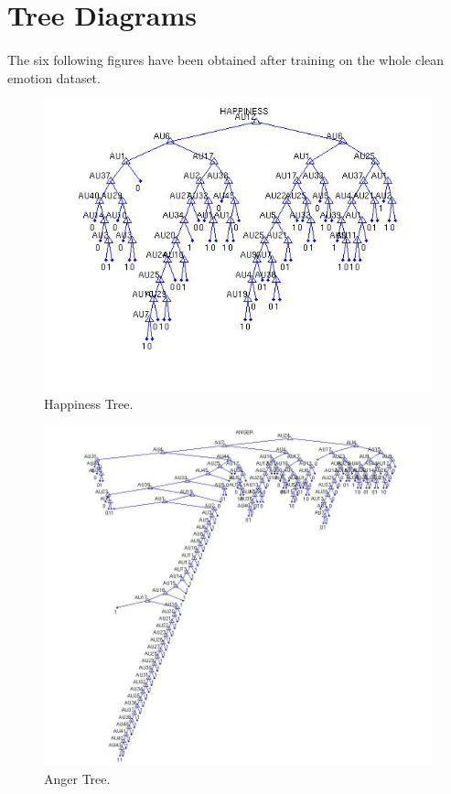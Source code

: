 \documentclass[a4paper,12pt,oneside,final]{report}
\newenvironment{changemargin}[2]{\begin{list}{}{%
\setlength{\topsep}{0pt}%
\setlength{\leftmargin}{0pt}%
\setlength{\rightmargin}{0pt}%
\setlength{\listparindent}{\parindent}%
\setlength{\itemindent}{\parindent}%
\setlength{\parsep}{0pt plus 1pt}%
\addtolength{\leftmargin}{#1}%
\addtolength{\rightmargin}{#2}%
}\item }{\end{list}}
\begin{document}
\section{Tree Diagrams}
\paragraph{}
The six following figures have been obtained after training on the whole clean emotion dataset.

\begin{figure}[!h]
\center
\includegraphics[scale=0.6]{happiness.jpg}
\caption{Happiness Tree.}
\end{figure}

\begin{figure}[h]
\begin{changemargin}{-20mm}{-20mm}
\begin{center}
\includegraphics[scale=0.6]{anger.jpg}
\end{center}
\caption{Anger Tree.}
\end{changemargin}
\end{figure}
\end{document}
